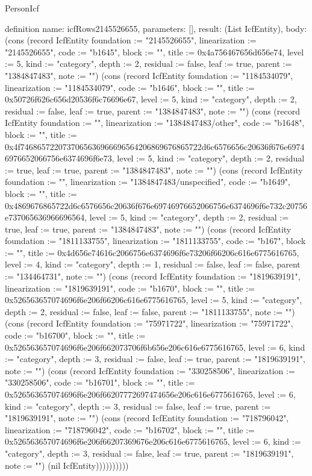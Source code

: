 \begin{lexlean}{PersonIcf}
\begin{semanticmodule}
definition{
  name: icfRows2145526655,
  parameters: [],
  result: (List IcfEntity),
  body: (cons (record IcfEntity {foundation := "2145526655", linearization := "2145526655", code := "b1645", block := "", title := 0x4a756467656d656e74, level := 5, kind := "category", depth := 2, residual := false, leaf := true, parent := "1384847483", note := ""}) (cons (record IcfEntity {foundation := "1184534079", linearization := "1184534079", code := "b1646", block := "", title := 0x50726f626c656d20536f6c76696e67, level := 5, kind := "category", depth := 2, residual := false, leaf := true, parent := "1384847483", note := ""}) (cons (record IcfEntity {foundation := "", linearization := "1384847483/other", code := "b1648", block := "", title := 0x4f7468657220737065636966696564206869676865722d6c6576656c20636f676e69746976652066756e6374696f6e73, level := 5, kind := "category", depth := 2, residual := true, leaf := true, parent := "1384847483", note := ""}) (cons (record IcfEntity {foundation := "", linearization := "1384847483/unspecified", code := "b1649", block := "", title := 0x4869676865722d6c6576656c20636f676e69746976652066756e6374696f6e732c20756e737065636966696564, level := 5, kind := "category", depth := 2, residual := true, leaf := true, parent := "1384847483", note := ""}) (cons (record IcfEntity {foundation := "1811133755", linearization := "1811133755", code := "b167", block := "", title := 0x4d656e74616c2066756e6374696f6e73206f66206c616e6775616765, level := 4, kind := "category", depth := 1, residual := false, leaf := false, parent := "134464731", note := ""}) (cons (record IcfEntity {foundation := "1819639191", linearization := "1819639191", code := "b1670", block := "", title := 0x526563657074696f6e206f66206c616e6775616765, level := 5, kind := "category", depth := 2, residual := false, leaf := false, parent := "1811133755", note := ""}) (cons (record IcfEntity {foundation := "75971722", linearization := "75971722", code := "b16700", block := "", title := 0x526563657074696f6e206f662073706f6b656e206c616e6775616765, level := 6, kind := "category", depth := 3, residual := false, leaf := true, parent := "1819639191", note := ""}) (cons (record IcfEntity {foundation := "330258506", linearization := "330258506", code := "b16701", block := "", title := 0x526563657074696f6e206f66207772697474656e206c616e6775616765, level := 6, kind := "category", depth := 3, residual := false, leaf := true, parent := "1819639191", note := ""}) (cons (record IcfEntity {foundation := "718796042", linearization := "718796042", code := "b16702", block := "", title := 0x526563657074696f6e206f66207369676e206c616e6775616765, level := 6, kind := "category", depth := 3, residual := false, leaf := true, parent := "1819639191", note := ""}) (nil IcfEntity))))))))))
}


\end{semanticmodule}
\end{lexlean}
